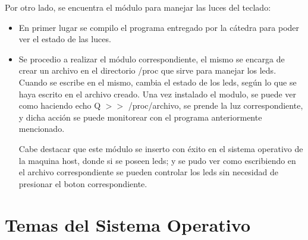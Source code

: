 \documentclass[a4paper, 12pt]{article}
\begin{document}
Por otro lado, se encuentra el m\'odulo para manejar las luces del teclado:
\begin{itemize}
\item En primer lugar se compilo el programa entregado por la c\'atedra para poder ver el estado de las luces.
\item Se procedio a realizar el m\'odulo correspondiente, el mismo se encarga de crear un archivo en el directorio /proc que sirve para manejar los leds. Cuando se escribe en el mismo, cambia el estado de los leds, seg\'un lo que se haya escrito en el archivo creado. Una vez instalado el modulo, se puede ver como haciendo echo Q $>>$ /proc/archivo, se prende la luz correspondiente, y dicha acci\'on se puede monitorear con el programa anteriormente mencionado. 

Cabe destacar que este m\'odulo se inserto con \'exito en el sistema operativo de la maquina host, donde si se poseen leds; y se pudo ver como escribiendo en el archivo correspondiente se pueden controlar los leds sin necesidad de presionar el boton correspondiente.
\end{itemize}



\section*{Temas del Sistema Operativo}
\end{document}
